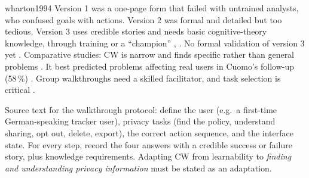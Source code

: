 \begin{papercard}{wharton1994}
 Version 1 was a one-page form that failed with untrained analysts, who confused goals with actions. Version 2 was formal and detailed but too tedious. Version 3 uses credible stories and needs basic cognitive-theory knowledge, through training or a ``champion'' , . No formal validation of version 3 yet . Comparative studies: CW is narrow and finds specific rather than general problems . It best predicted problems affecting real users in Cuomo's follow-up (58\,\%) . Group walkthroughs need a skilled facilitator, and task selection is critical .

 Source text for the walkthrough protocol: define the user (e.g.\ a first-time German-speaking tracker user), privacy tasks (find the policy, understand sharing, opt out, delete, export), the correct action sequence, and the interface state. For every step, record the four answers with a credible success or failure story, plus knowledge requirements. Adapting CW from learnability to \emph{finding and understanding privacy information} must be stated as an adaptation.
\end{papercard}
